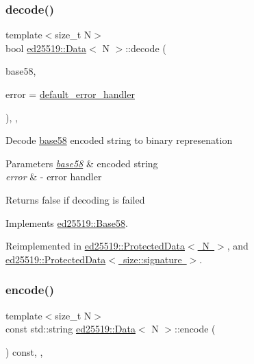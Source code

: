 \subsubsection{\texorpdfstring{decode()}{decode()}}
{\footnotesize\ttfamily template$<$size\+\_\+t N$>$ \\
bool \mbox{\hyperlink{classed25519_1_1_data}{ed25519\+::\+Data}}$<$ N $>$\+::decode (\begin{DoxyParamCaption}\item[{const std\+::string \&}]{base58,  }\item[{const \mbox{\hyperlink{namespaceed25519_a6ba572942b3c18591fc869d52a6b16e6}{Error\+Handler}} \&}]{error = {\ttfamily \mbox{\hyperlink{namespaceed25519_a7c7bb6ed17541162959c33ed3e3b15fb}{default\+\_\+error\+\_\+handler}}} }\end{DoxyParamCaption})\hspace{0.3cm}{\ttfamily [inline]}, {\ttfamily [override]}, {\ttfamily [virtual]}}

Decode \mbox{\hyperlink{namespaceed25519_1_1base58}{base58}} encoded string to binary represenation 
\begin{DoxyParams}{Parameters}
{\em \mbox{\hyperlink{namespaceed25519_1_1base58}{base58}}} & encoded string \\
\hline
{\em error} & -\/ error handler \\
\hline
\end{DoxyParams}
\begin{DoxyReturn}{Returns}
false if decoding is failed 
\end{DoxyReturn}


Implements \mbox{\hyperlink{classed25519_1_1_base58_a3cb74be32923dcfb03a24b65015bee84}{ed25519\+::\+Base58}}.



Reimplemented in \mbox{\hyperlink{classed25519_1_1_protected_data_a708852546126e7d19229e247b92a98f6}{ed25519\+::\+Protected\+Data$<$ N $>$}}, and \mbox{\hyperlink{classed25519_1_1_protected_data_a708852546126e7d19229e247b92a98f6}{ed25519\+::\+Protected\+Data$<$ size\+::signature $>$}}.

\mbox{\label{classed25519_1_1_data_a2dc2e23b950a10b168d7509a63ffca53}} 
\subsubsection{\texorpdfstring{encode()}{encode()}}
{\footnotesize\ttfamily template$<$size\+\_\+t N$>$ \\
const std\+::string \mbox{\hyperlink{classed25519_1_1_data}{ed25519\+::\+Data}}$<$ N $>$\+::encode (\begin{DoxyParamCaption}{ }\end{DoxyParamCaption}) const\hspace{0.3cm}{\ttfamily [inline]}, {\ttfamily [override]}, {\ttfamily [virtual]}}

